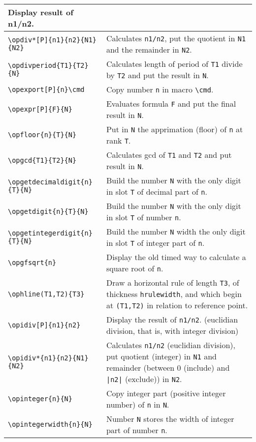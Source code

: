 \documentclass[12pt]{report}
\begin{document}
\begin{longtable}{|l|p{6.3cm}|}
  Display result of n1/n2. \\\hline
  \verb+\opdiv*[P]{n1}{n2}{N1}{N2}+ &
  Calculates \verb+n1/n2+, put the quotient in \verb+N1+ and the
  remainder in \verb+N2+. \\\hline
  \verb+\opdivperiod{T1}{T2}{N}+ &
  Calculates length of period of \verb+T1+ divide by \verb+T2+ and put
  the result in \verb+N+. \\\hline
  \verb+\opexport[P]{n}\cmd+ &
  Copy number \verb+n+ in macro \verb+\cmd+. \\\hline
  \verb+\opexpr[P]{F}{N}+ &
  Evaluates formula \texttt{F} and put the final result in
  \texttt{N}. \\\hline
  \verb+\opfloor{n}{T}{N}+ &
  Put in \verb+N+ the apprimation (floor) of \verb+n+ at rank
  \verb+T+. \\\hline
  \verb+\opgcd{T1}{T2}{N}+ &
  Calculates gcd of \verb+T1+ and \verb+T2+ and put result in
  \verb+N+. \\\hline
  \verb+\opgetdecimaldigit{n}{T}{N}+ &
  Build the number \verb+N+ with the only digit in slot 
  \verb+T+ of decimal part of \verb+n+. \\\hline
  \verb+\opgetdigit{n}{T}{N}+ &
  Build the number \verb+N+ with the only digit in slot
  \verb+T+ of number \verb+n+. \\\hline
  \verb+\opgetintegerdigit{n}{T}{N}+ &
  Build the number \verb+N+ width the only digit in slot
  \verb+T+ of integer part of \verb+n+. \\\hline
  \verb+\opgfsqrt{n}+ &
  Display the old timed way to calculate a square root of
  \verb+n+. \\\hline
  \verb+\ophline(T1,T2){T3}+ &
  Draw a horizontal rule of length \verb+T3+, of thickness
  \verb+hrulewidth+, and which begin at \verb+(T1,T2)+ in relation to
  reference point. \\\hline
  \verb+\opidiv[P]{n1}{n2}+ &
  Display the result of \verb+n1/n2+. (euclidian division, that is,
  with integer division) \\\hline
  \verb+\opidiv*{n1}{n2}{N1}{N2}+ &
  Calculates \verb+n1/n2+ (euclidian division), put quotient
  (integer) in \verb+N1+ and remainder (between 0 (include) and
  \verb+|n2|+ (exclude)) in \verb+N2+. \\\hline
  \verb+\opinteger{n}{N}+ &
  Copy integer part (positive integer number) of \verb+n+
  in \verb+N+. \\\hline
  \verb+\opintegerwidth{n}{N}+ &
  Number \verb+N+ stores the width of integer part of number \verb+n+.
  \\\hline

\end{longtable}
\end{document}
